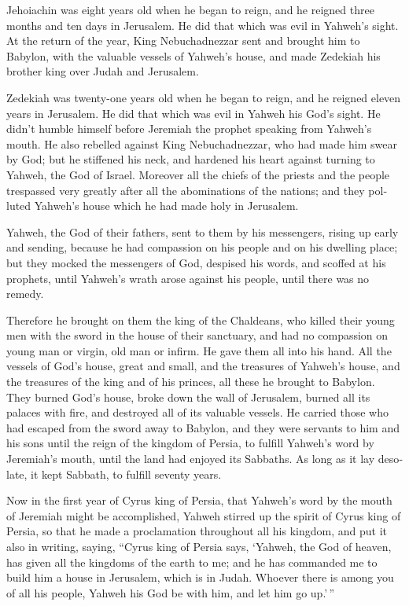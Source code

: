 \begin{paracol}{2}
\begin{otherlanguage}{english}
 Jehoiachin was eight years old when he began to reign,
and he reigned three months and ten days in Jerusalem. He did that which
was evil in Yahweh's sight.  At the return of the year,
King Nebuchadnezzar sent and brought him to Babylon, with the valuable
vessels of Yahweh's house, and made Zedekiah his brother king over Judah
and Jerusalem.

 Zedekiah was twenty-one years old when he began to
reign, and he reigned eleven years in Jerusalem.  He did
that which was evil in Yahweh his God's sight. He didn't humble himself
before Jeremiah the prophet speaking from Yahweh's mouth.
 He also rebelled against King Nebuchadnezzar, who had
made him swear by God; but he stiffened his neck, and hardened his heart
against turning to Yahweh, the God of Israel.  Moreover
all the chiefs of the priests and the people trespassed very greatly
after all the abominations of the nations; and they polluted Yahweh's
house which he had made holy in Jerusalem.

 Yahweh, the God of their fathers, sent to them by his
messengers, rising up early and sending, because he had compassion on
his people and on his dwelling place;  but they mocked
the messengers of God, despised his words, and scoffed at his prophets,
until Yahweh's wrath arose against his people, until there was no
remedy.

 Therefore he brought on them the king of the Chaldeans,
who killed their young men with the sword in the house of their
sanctuary, and had no compassion on young man or virgin, old man or
infirm. He gave them all into his hand.  All the vessels
of God's house, great and small, and the treasures of Yahweh's house,
and the treasures of the king and of his princes, all these he brought
to Babylon.  They burned God's house, broke down the wall
of Jerusalem, burned all its palaces with fire, and destroyed all of its
valuable vessels.  He carried those who had escaped from
the sword away to Babylon, and they were servants to him and his sons
until the reign of the kingdom of Persia,  to fulfill
Yahweh's word by Jeremiah's mouth, until the land had enjoyed its
Sabbaths. As long as it lay desolate, it kept Sabbath, to fulfill
seventy years.

 Now in the first year of Cyrus king of Persia, that
Yahweh's word by the mouth of Jeremiah might be accomplished, Yahweh
stirred up the spirit of Cyrus king of Persia, so that he made a
proclamation throughout all his kingdom, and put it also in writing,
saying,  ``Cyrus king of Persia says, `Yahweh, the God of
heaven, has given all the kingdoms of the earth to me; and he has
commanded me to build him a house in Jerusalem, which is in Judah.
Whoever there is among you of all his people, Yahweh his God be with
him, and let him go up.'\,'' \end{otherlanguage}
\end{paracol}

